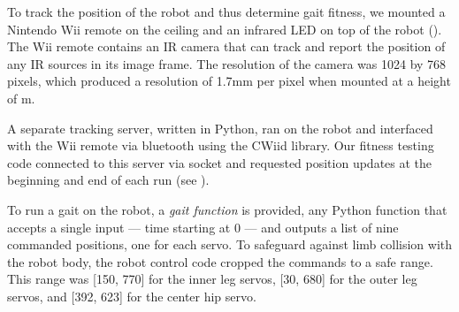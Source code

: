 To track the position of the robot and thus determine gait fitness, we
mounted a Nintendo Wii remote on the ceiling and an infrared LED on
top of the robot ().  The Wii remote contains an
IR camera that can track and report the position of any IR sources in
its image frame.  The resolution of the camera was 1024 by 768 pixels,
which produced a resolution of 1.7mm per pixel when mounted at a
height of m.

A separate tracking server, written in Python, ran on the robot and
interfaced with the Wii remote via bluetooth using the CWiid
library\cite{cwiid}.  Our fitness testing code connected to this
server via socket and requested position updates at the beginning and
end of each run (see ).


To run a gait on the robot, a \emph{gait
  function} is provided, any Python function that accepts a single input --- time
starting at 0 --- and outputs a list of nine commanded positions, one
for each servo.  To safeguard against limb collision with the robot
body, the robot control code cropped the commands to a safe range.
This range was [150, 770] for the inner leg servos, [30, 680] for the
outer leg servos, and [392, 623] for the center hip servo.





